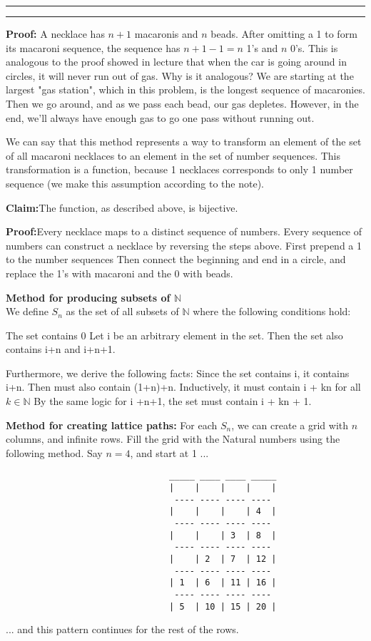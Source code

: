 \documentclass[11pt]{article}
\newcounter{questionCounter}
\newcounter{partCounter}[questionCounter]
\newenvironment{question}[2][\arabic{questionCounter}]{%
    \setcounter{partCounter}{0}%
    \vspace{.25in} \hrule \vspace{0.5em}%
        \noindent{\bf #2}%
    \vspace{0.8em} \hrule \vspace{.10in}%
    \addtocounter{questionCounter}{1}%
}{}
\begin{document}
\begin{question}{Macaroni Revisited}
\textbf{Proof:} A necklace has $n+1$ macaronis and $n$ beads. After omitting a 1
to form its macaroni sequence, the sequence has $n+1 -1=n$ 1's and $n$ 0's.
This is analogous to the proof showed in lecture that when the car is going around
in circles, it will never run out of gas. Why is it analogous? We are starting 
at the largest "gas station", which in this problem, is the longest sequence of 
macaronies. Then we go around, and as we pass each bead, our gas depletes. However,
in the end, we'll always have enough gas to go one pass without running out.

We can say that this method represents a way to transform an element of the set 
of all macaroni necklaces to an element in the set of number sequences. This 
transformation is a function, because 1 necklaces corresponds to only 1 number 
sequence (we make this assumption according to the note).

\textbf{Claim:}The function, as described above, is bijective.

\textbf{Proof:}Every necklace maps to a distinct sequence of numbers. Every 
sequence of numbers can construct a necklace by reversing the steps above. 
First prepend a 1 to the number sequences Then connect the beginning and end in a 
circle, and replace the 1's with macaroni and the 0 with beads.

\textbf{Method for producing subsets of $\mathbb{N}$}\\
We define $S_n$ as the set of all subsets of $\mathbb{N}$ where the following 
conditions hold:

The set contains 0
Let i be an arbitrary element in the set. 
Then the set also contains i+n and i+n+1.

Furthermore, we derive the following facts:
Since the set contains i, it contains i+n. Then must also contain (1+n)+n. Inductively, it must 
contain i + kn for all $k \in \mathbb{N}$
By the same logic for i +n+1, the set must contain i + kn + 1.

\textbf{Method for creating lattice paths:}
For each $S_n$, we can create a grid with $n$ columns, and infinite rows.
Fill the grid with the Natural numbers using the following method.
Say $n=4$, and start at 1 ...
\begin{verbatim}
                                _____ ____ ____ _____
                                |    |    |    |    |
                                 ---- ---- ---- ----
                                |    |    |    | 4  |
                                 ---- ---- ---- ----
                                |    |    | 3  | 8  |
                                 ---- ---- ---- ----
                                |    | 2  | 7  | 12 |
                                 ---- ---- ---- ----
                                | 1  | 6  | 11 | 16 |
                                 ---- ---- ---- ----
                                | 5  | 10 | 15 | 20 |
\end{verbatim}
... and this pattern continues for the rest of the rows. 


\end{question}
\end{document}
